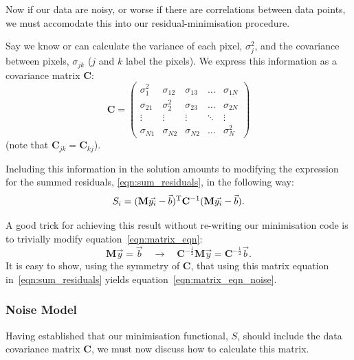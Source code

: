 \documentclass[letterpaper, 11pt]{article}
\def\TODO#1{ {\color{black}{\bf TODO: {#1}}}\xspace}
\begin{document}
Now if our data are noisy, or worse if there are correlations between data points, we must accomodate this into our residual-minimisation procedure.

Say we know or can calculate the variance of each pixel, $\sigma_j^2$, and the covariance between pixels, $\sigma_{jk}$ ($j$ and $k$ label the pixels).  We express this information as a covariance matrix $\mathbf{C}$:
\begin{equation}
	\mathbf{C} =
	\begin{pmatrix}
		\sigma_1^2	& \sigma_{12}	& \sigma_{13}	& \ldots	& \sigma_{1N}\\
		\sigma_{21}	& \sigma_2^2	& \sigma_{23}	& \ldots 	& \sigma_{2N}\\
		\vdots		& \vdots 		&  \vdots		& \ddots & \vdots \\
		\sigma_{N1}	& \sigma_{N2} 	& \sigma_{N2}	& \ldots	& \sigma_N^2
	\end{pmatrix}
\end{equation}
(note that $\mathbf{C}_{jk}=\mathbf{C}_{kj}$).

Including this information in the solution amounts to modifying the expression for the summed residuals, \ref{eqn:sum_residuals}, in the following way:
\begin{equation}\label{eqn:matrix_eqn_noise}
	S_i = (\mathbf M \vec{y_i} - \vec b)^{\rm T}\mathbf{C}^{-1}(\mathbf M \vec{y_i} - \vec b).
\end{equation}
\TODO{Cato: read up on this.}

A good trick for achieving this result without re-writing our minimisation code is to trivially modify equation~\ref{eqn:matrix_eqn}:
\begin{equation}
	\mathbf M \vec y = \vec b \quad\longrightarrow\quad \mathbf{C}^{-\frac{1}{2}}\mathbf{M} \vec y = \mathbf{C}^{-\frac{1}{2}}\vec b.
\end{equation}
It is easy to show, using the symmetry of $\mathbf{C}$, that using this matrix equation in~\ref{eqn:sum_residuals} yields equation~\ref{eqn:matrix_eqn_noise}.

\subsubsection{Noise Model}

Having established that our minimisation functional, $S$, should include the data covariance matrix $\mathbf C$, we must now discuss how to calculate this matrix.
\end{document}
